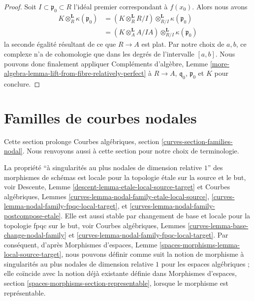 \begin{proof}
\medskip\noindent
Soit $I \subset \mathfrak p_0 \subset R$ l'idéal premier
correspondant à $f(x_0)$. Alors nous avons
\begin{align*}
K \otimes_R^\mathbf{L} \kappa(\mathfrak p_0)
& =
(K \otimes_R^\mathbf{L} R/I) \otimes_{R/I}^\mathbf{L}
\kappa(\mathfrak p_0) \\
& =
(K \otimes_A^\mathbf{L} A/IA) \otimes_{R/I}^\mathbf{L} \kappa(\mathfrak p_0)
\end{align*}
la seconde égalité résultant de ce que $R \to A$ est plat.
Par notre choix de $a, b$, ce complexe n'a de cohomologie
que dans les degrés de l'intervalle $[a, b]$.
Nous pouvons donc finalement appliquer
Compléments d'algèbre, Lemme
\ref{more-algebra-lemma-lift-from-fibre-relatively-perfect}
à $R \to A$, $\mathfrak q_0$, $\mathfrak p_0$ et $K$
pour conclure.
\end{proof}







\section{Familles de courbes nodales}
\label{section-families-nodal}

\noindent
Cette section prolonge
Courbes algébriques, section \ref{curves-section-families-nodal}.
Nous renvoyons aussi à cette section pour notre choix
de terminologie.

\medskip\noindent
La propriété ``à singularités au plus nodales de dimension relative $1$''
des morphismes de schémas est locale pour la topologie \'etale sur la source et le but, voir
Descente, Lemme \ref{descent-lemma-etale-local-source-target}
et
Courbes algébriques, Lemmes \ref{curves-lemma-nodal-family-etale-local-source},
\ref{curves-lemma-nodal-family-fpqc-local-target}, et
\ref{curves-lemma-nodal-family-postcompose-etale}.
Elle est aussi stable par changement de base et locale pour la topologie fpqc sur le but, voir
Courbes algébriques, Lemmes \ref{curves-lemma-base-change-nodal-family} et
\ref{curves-lemma-nodal-family-fpqc-local-target}. Par conséquent, d'après
Morphismes d'espaces, Lemme \ref{spaces-morphisms-lemma-local-source-target},
nous pouvons définir comme suit la notion de morphisme à singularités au plus nodales de dimension relative
$1$ pour les espaces algébriques ; elle coïncide avec la
notion déjà existante définie dans
Morphismes d'espaces, section \ref{spaces-morphisms-section-representable},
lorsque le morphisme est représentable.

